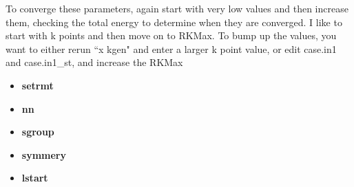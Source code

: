 \documentclass[12pt]{article}
\begin{document}
To converge these parameters, again start with very low values and then increase them, checking the total energy to determine when they are converged.  I like to start with k points and then move on to RKMax.  To bump up the values, you want to either rerun ``x kgen" and enter a larger k point value, or edit case.in1 and case.in1\_st, and increase the RKMax


\begin{itemize}
	\item \textbf{setrmt}
	\item \textbf{nn}
	\item \textbf{sgroup}
	\item  \textbf{symmery}
	\item \textbf{lstart}
	
\end{itemize}
\end{document}
